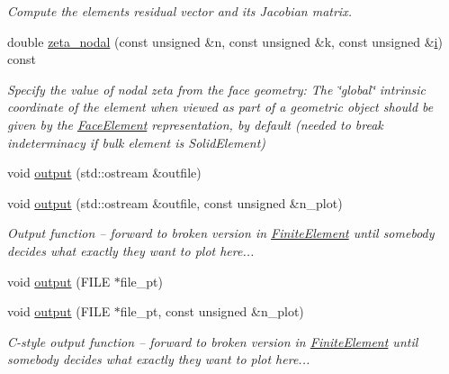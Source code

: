 \begin{DoxyCompactItemize}
\begin{DoxyCompactList}\small\item\em Compute the element\textquotesingle{}s residual vector and its Jacobian matrix. \end{DoxyCompactList}\item 
double \hyperlink{classoomph_1_1UnsteadyHeatFluxElement_a5ee386604e4a99eb2daa220c98f17513}{zeta\+\_\+nodal} (const unsigned \&n, const unsigned \&k, const unsigned \&\hyperlink{cfortran_8h_adb50e893b86b3e55e751a42eab3cba82}{i}) const
\begin{DoxyCompactList}\small\item\em Specify the value of nodal zeta from the face geometry\+: The \char`\"{}global\char`\"{} intrinsic coordinate of the element when viewed as part of a geometric object should be given by the \hyperlink{classoomph_1_1FaceElement}{Face\+Element} representation, by default (needed to break indeterminacy if bulk element is Solid\+Element) \end{DoxyCompactList}\item 
void \hyperlink{classoomph_1_1UnsteadyHeatFluxElement_acd0d11f32966ffdb498ab7f64303bdc9}{output} (std\+::ostream \&outfile)
\item 
void \hyperlink{classoomph_1_1UnsteadyHeatFluxElement_ae3bc4021112b2fff59ae1d34ea1f7364}{output} (std\+::ostream \&outfile, const unsigned \&n\+\_\+plot)
\begin{DoxyCompactList}\small\item\em Output function -- forward to broken version in \hyperlink{classoomph_1_1FiniteElement}{Finite\+Element} until somebody decides what exactly they want to plot here... \end{DoxyCompactList}\item 
void \hyperlink{classoomph_1_1UnsteadyHeatFluxElement_a96ad3606e27ea00fc36c9ceb1cb9986b}{output} (F\+I\+LE $\ast$file\+\_\+pt)
\item 
void \hyperlink{classoomph_1_1UnsteadyHeatFluxElement_aadaff4b6890b01fb9081408d69806b52}{output} (F\+I\+LE $\ast$file\+\_\+pt, const unsigned \&n\+\_\+plot)
\begin{DoxyCompactList}\small\item\em C-\/style output function -- forward to broken version in \hyperlink{classoomph_1_1FiniteElement}{Finite\+Element} until somebody decides what exactly they want to plot here... \end{DoxyCompactList}\end{DoxyCompactItemize}
